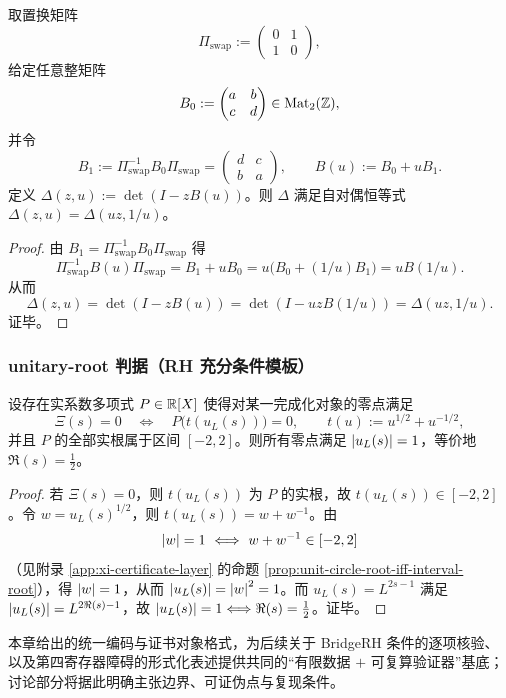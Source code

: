 \begin{proposition}\label{prop:cc-bridge-2x2-swap}
取置换矩阵
$$
\Pi_{\mathrm{swap}}:=\begin{pmatrix}0&1\\1&0\end{pmatrix},
$$
给定任意整矩阵
$$
B_0:=\begin{pmatrix}a&b\\c&d\end{pmatrix}\in \mathrm{Mat}_{2}(\mathbb{Z}),
$$
并令
$$
B_1:=\Pi_{\mathrm{swap}}^{-1}B_0\Pi_{\mathrm{swap}}
=\begin{pmatrix}d&c\\b&a\end{pmatrix},
\qquad
B(u):=B_0+uB_1.
$$
定义 $\Delta(z,u):=\det(I-zB(u))$。则 $\Delta$ 满足自对偶恒等式 $\Delta(z,u)=\Delta(uz,1/u)$。
\end{proposition}

\begin{proof}
由 $B_1=\Pi_{\mathrm{swap}}^{-1}B_0\Pi_{\mathrm{swap}}$ 得
$$
\Pi_{\mathrm{swap}}^{-1}B(u)\Pi_{\mathrm{swap}}
=B_1+uB_0
=u\bigl(B_0+(1/u)B_1\bigr)
=uB(1/u).
$$
从而
$$
\Delta(z,u)
=\det(I-zB(u))
=\det(I-uzB(1/u))
=\Delta(uz,1/u).
$$
证毕。
\end{proof}

\subsubsection{unitary-root 判据（RH 充分条件模板）}\label{subsubsec:cc-unitary-root}
\begin{theorem}\label{thm:cc-unitary-root}
设存在实系数多项式 $P\in\mathbb{R}[X]$ 使得对某一完成化对象的零点满足
$$
\Xi(s)=0\quad\Longleftrightarrow\quad P\bigl(t(u_L(s))\bigr)=0,
\qquad t(u):=u^{1/2}+u^{-1/2},
$$
并且 $P$ 的全部实根属于区间 $[-2,2]$。则所有零点满足 $\left\lvert u_L(s)\right\rvert=1$，等价地 $\Re(s)=\tfrac12$。
\end{theorem}

\begin{proof}
若 $\Xi(s)=0$，则 $t(u_L(s))$ 为 $P$ 的实根，故 $t(u_L(s))\in[-2,2]$。令 $w=u_L(s)^{1/2}$，则 $t(u_L(s))=w+w^{-1}$。由
$$
\abs{w}=1\ \Longleftrightarrow\ w+w^{-1}\in[-2,2]
$$
（见附录 \ref{app:xi-certificate-layer} 的命题 \ref{prop:unit-circle-root-iff-interval-root}），得 $\left\lvert w\right\rvert=1$，从而 $\left\lvert u_L(s)\right\rvert=\left\lvert w\right\rvert^2=1$。而 $u_L(s)=L^{2s-1}$ 满足 $\left\lvert u_L(s)\right\rvert=L^{2\Re(s)-1}$，故 $\left\lvert u_L(s)\right\rvert=1\Longleftrightarrow \Re(s)=\tfrac12$。证毕。
\end{proof}

本章给出的统一编码与证书对象格式，为后续关于 BridgeRH 条件的逐项核验、以及第四寄存器障碍的形式化表述提供共同的“有限数据 $+$ 可复算验证器”基底；讨论部分将据此明确主张边界、可证伪点与复现条件。

